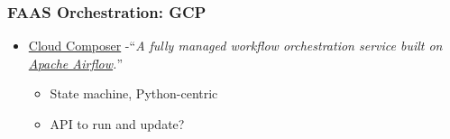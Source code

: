 \documentclass[11pt,aspectratio=169]{beamer}
\begin{document}
\begin{nrcanFrame}
  \frametitle{FAAS Orchestration: GCP}
  \begin{itemize}
  \item \href{https://cloud.google.com/composer/}
         {Cloud Composer}
         -``\textit{A fully managed workflow orchestration service
           built on
           \href{https://airflow.apache.org/}{Apache Airflow}.}''
         \begin{itemize}
         \item State machine, Python-centric
         \item API to run and update?
         \end{itemize}
  \end{itemize}
\end{nrcanFrame}


\nrcanLastFrame
\end{document}
